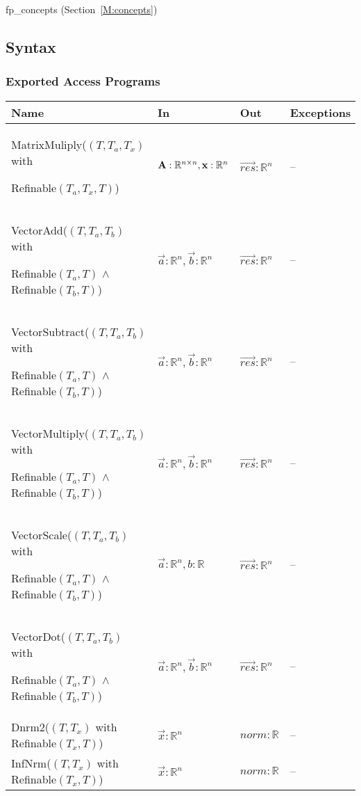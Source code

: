 \documentclass[12pt, titlepage]{article}
\begin{document}
fp\_concepts (Section~\ref{M:concepts})

\subsection{Syntax}

\subsubsection{Exported Access Programs}

\begin{center}
  \renewcommand{\arraystretch}{1.2}
  \begin{tabularx}{\linewidth}{%
    >{\raggedright\arraybackslash}X
    >{\raggedright\arraybackslash}l
    >{\raggedright\arraybackslash}l
    >{\raggedright\arraybackslash}l
    }
    \hline
    \textbf{Name}                                          & \textbf{In}                           & \textbf{Out}             & \textbf{Exceptions} \\
    \hline
    MatrixMuliply(\((T, T_a, T_x)\) with \par
    Refinable\((T_a, T_x, T)\))                        & \(\mathbf{A}: \mathbb{R}^{n \times n}, \mathbf{x}: \mathbb{R}^n\) & \(\vec{res}: \mathbb{R}^n\) & --            \\
    VectorAdd(\((T, T_a, T_b)\) with \par
    Refinable\((T_a, T)\) \(\land\) Refinable\((T_b, T)\)) & \(\vec{a}: \mathbb{R}^n, \vec{b}: \mathbb{R}^n\)              & \(\vec{res}: \mathbb{R}^n\) & --            \\
    VectorSubtract(\((T, T_a, T_b)\) with \par
    Refinable\((T_a, T)\) \(\land\) Refinable\((T_b, T)\)) & \(\vec{a}: \mathbb{R}^n, \vec{b}: \mathbb{R}^n\)              & \(\vec{res}: \mathbb{R}^n\) & --            \\
    VectorMultiply(\((T, T_a, T_b)\) with \par
    Refinable\((T_a, T)\) \(\land\) Refinable\((T_b, T)\)) & \(\vec{a}: \mathbb{R}^n, \vec{b}: \mathbb{R}^n\)              & \(\vec{res}: \mathbb{R}^n\) & --            \\
    VectorScale(\((T, T_a, T_b)\) with \par
    Refinable\((T_a, T)\) \(\land\) Refinable\((T_b, T)\)) & \(\vec{a}: \mathbb{R}^n, b: \mathbb{R}\)               & \(\vec{res}: \mathbb{R}^n\) & --            \\
    VectorDot(\((T, T_a, T_b)\) with \par
    Refinable\((T_a, T)\) \(\land\) Refinable\((T_b, T)\)) & \(\vec{a}: \mathbb{R}^n, \vec{b}: \mathbb{R}^n\)              & \(\vec{res}: \mathbb{R}^n\) & --            \\
    Dnrm2(\((T, T_x)\) with Refinable\((T_x, T)\))     & \(\vec{x}: \mathbb{R}^n\)                      & \(norm: \mathbb{R}\)       & --            \\
    InfNrm(\((T, T_x)\) with Refinable\((T_x, T)\))    & \(\vec{x}: \mathbb{R}^n\)                      & \(norm: \mathbb{R}\)       & --            \\
    \hline
  \end{tabularx}
\end{center}
\end{document}
